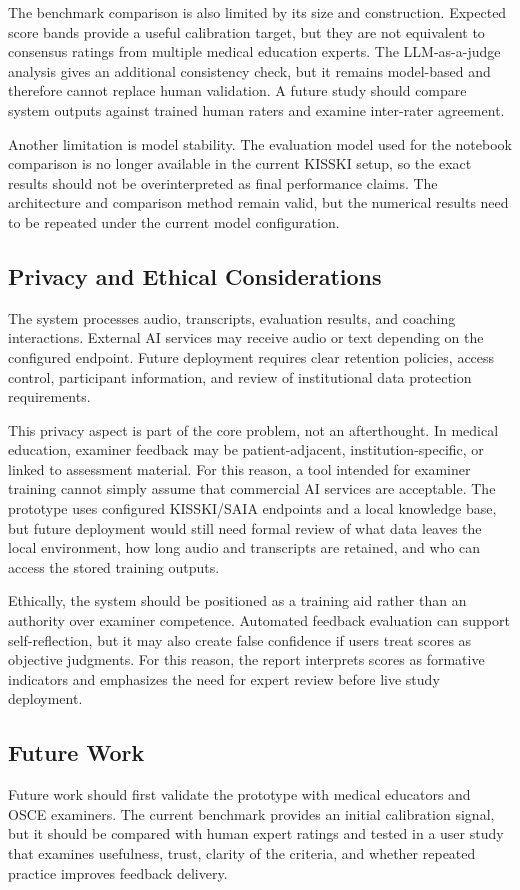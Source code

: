 The benchmark comparison is also limited by its size and construction. Expected
score bands provide a useful calibration target, but they are not equivalent to
consensus ratings from multiple medical education experts. The LLM-as-a-judge
analysis gives an additional consistency check, but it remains model-based and
therefore cannot replace human validation. A future study should compare system
outputs against trained human raters and examine inter-rater agreement.

Another limitation is model stability. The evaluation model used for the
notebook comparison is no longer available in the current KISSKI setup, so the
exact results should not be overinterpreted as final performance claims. The
architecture and comparison method remain valid, but the numerical results need
to be repeated under the current model configuration.

\subsection{Privacy and Ethical Considerations}
The system processes audio, transcripts, evaluation results, and coaching
interactions. External AI services may receive audio or text depending on the
configured endpoint. Future deployment requires clear retention policies, access
control, participant information, and review of institutional data protection
requirements.

This privacy aspect is part of the core problem, not an afterthought. In medical
education, examiner feedback may be patient-adjacent, institution-specific, or
linked to assessment material. For this reason, a tool intended for examiner
training cannot simply assume that commercial AI services are acceptable. The
prototype uses configured KISSKI/SAIA endpoints and a local knowledge base, but
future deployment would still need formal review of what data leaves the local
environment, how long audio and transcripts are retained, and who can access the
stored training outputs.

Ethically, the system should be positioned as a training aid rather than an
authority over examiner competence. Automated feedback evaluation can support
self-reflection, but it may also create false confidence if users treat scores
as objective judgments. For this reason, the report interprets scores as
formative indicators and emphasizes the need for expert review before live study
deployment.

\subsection{Future Work}
Future work should first validate the prototype with medical educators and OSCE
examiners. The current benchmark provides an initial calibration signal, but it
should be compared with human expert ratings and tested in a user study that
examines usefulness, trust, clarity of the criteria, and whether repeated
practice improves feedback delivery.

